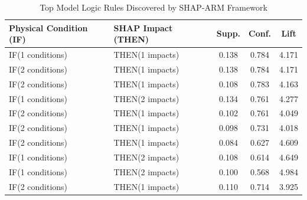 \begin{table}[htbp]
\centering
\caption{Top Model Logic Rules Discovered by SHAP-ARM Framework}
\label{tab:model_logic_rules}
\begin{tabular}{p{}p{}ccc}
\toprule
\textbf{Physical Condition (IF)} & \textbf{SHAP Impact (THEN)} & \textbf{Supp.} & \textbf{Conf.} & \textbf{Lift} \\
\midrule
IF(1 conditions) & THEN(1 impacts) & 0.138 & 0.784 & 4.171 \\
IF(2 conditions) & THEN(1 impacts) & 0.138 & 0.784 & 4.171 \\
IF(2 conditions) & THEN(1 impacts) & 0.108 & 0.783 & 4.163 \\
IF(1 conditions) & THEN(2 impacts) & 0.134 & 0.761 & 4.277 \\
IF(2 conditions) & THEN(1 impacts) & 0.102 & 0.761 & 4.049 \\
IF(2 conditions) & THEN(1 impacts) & 0.098 & 0.731 & 4.018 \\
IF(2 conditions) & THEN(1 impacts) & 0.084 & 0.627 & 4.609 \\
IF(1 conditions) & THEN(2 impacts) & 0.108 & 0.614 & 4.649 \\
IF(1 conditions) & THEN(2 impacts) & 0.100 & 0.568 & 4.984 \\
IF(2 conditions) & THEN(1 impacts) & 0.110 & 0.714 & 3.925 \\
\bottomrule
\end{tabular}
\end{table}